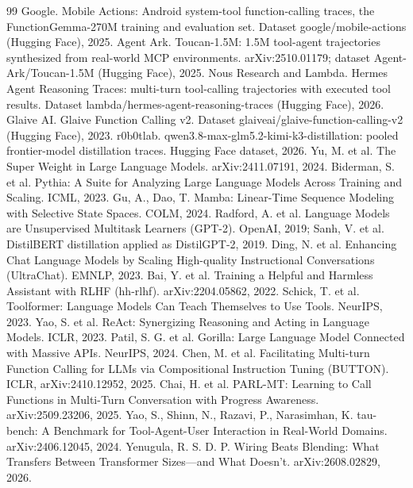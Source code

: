 \documentclass{article}
\begin{document}
\begin{thebibliography}{99}
 Google. Mobile Actions: Android system-tool function-calling traces, the FunctionGemma-270M training and evaluation set. Dataset google/mobile-actions (Hugging Face), 2025.
 Agent Ark. Toucan-1.5M: 1.5M tool-agent trajectories synthesized from real-world MCP environments. arXiv:2510.01179; dataset Agent-Ark/Toucan-1.5M (Hugging Face), 2025.
 Nous Research and Lambda. Hermes Agent Reasoning Traces: multi-turn tool-calling trajectories with executed tool results. Dataset lambda/hermes-agent-reasoning-traces (Hugging Face), 2026.
 Glaive AI. Glaive Function Calling v2. Dataset glaiveai/glaive-function-calling-v2 (Hugging Face), 2023.
 r0b0tlab. qwen3.8-max-glm5.2-kimi-k3-distillation: pooled frontier-model distillation traces. Hugging Face dataset, 2026.
 Yu, M. et al. The Super Weight in Large Language Models. arXiv:2411.07191, 2024.
 Biderman, S. et al. Pythia: A Suite for Analyzing Large Language Models Across Training and Scaling. ICML, 2023.
 Gu, A., Dao, T. Mamba: Linear-Time Sequence Modeling with Selective State Spaces. COLM, 2024.
 Radford, A. et al. Language Models are Unsupervised Multitask Learners (GPT-2). OpenAI, 2019; Sanh, V. et al. DistilBERT distillation applied as DistilGPT-2, 2019.
 Ding, N. et al. Enhancing Chat Language Models by Scaling High-quality Instructional Conversations (UltraChat). EMNLP, 2023.
 Bai, Y. et al. Training a Helpful and Harmless Assistant with RLHF (hh-rlhf). arXiv:2204.05862, 2022.
 Schick, T. et al. Toolformer: Language Models Can Teach Themselves to Use Tools. NeurIPS, 2023.
 Yao, S. et al. ReAct: Synergizing Reasoning and Acting in Language Models. ICLR, 2023.
 Patil, S. G. et al. Gorilla: Large Language Model Connected with Massive APIs. NeurIPS, 2024.
 Chen, M. et al. Facilitating Multi-turn Function Calling for LLMs via Compositional Instruction Tuning (BUTTON). ICLR, arXiv:2410.12952, 2025.
 Chai, H. et al. PARL-MT: Learning to Call Functions in Multi-Turn Conversation with Progress Awareness. arXiv:2509.23206, 2025.
 Yao, S., Shinn, N., Razavi, P., Narasimhan, K. tau-bench: A Benchmark for Tool-Agent-User Interaction in Real-World Domains. arXiv:2406.12045, 2024.
 Yenugula, R. S. D. P. Wiring Beats Blending: What Transfers Between Transformer Sizes---and What Doesn't. arXiv:2608.02829, 2026.
\end{thebibliography}
\appendix
\end{document}
